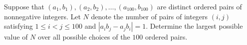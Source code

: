 Suppose that $(a_1,b_1),(a_2,b_2),\dots,(a_{100},b_{100})$ are distinct ordered pairs of nonnegative integers. Let $N$ denote the number of pairs of integers $(i,j)$ satisfying $1\leq i<j\leq100$ and $|a_ib_j-a_jb_i|=1$. Determine the largest possible value of $N$ over all possible choices of the $100$ ordered pairs.
